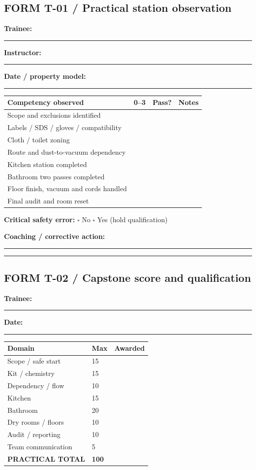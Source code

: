 \documentclass[10pt,letterpaper,oneside]{article}
\newcommand{\smalltable}{\par\small\renewcommand{\arraystretch}{1.24}}
\newcommand{\restorenormalfonttable}{\par\normalsize\renewcommand{\arraystretch}{1}}
\begin{document}
\subsection*{FORM T-01 / Practical station observation}
\textbf{Trainee:} \rule{2.2in}{.3pt} \quad \textbf{Instructor:} \rule{2in}{.3pt}\par
\textbf{Date / property model:} \rule{4.6in}{.3pt}
\smalltable\begin{tabularx}{\linewidth}{X p{.12\linewidth}p{.12\linewidth}p{.12\linewidth}}\toprule
Competency observed & 0--3 & Pass? & Notes\\\midrule
Scope and exclusions identified & & & \\
Labels / SDS / gloves / compatibility & & & \\
Cloth / toilet zoning & & & \\
Route and dust-to-vacuum dependency & & & \\
Kitchen station completed & & & \\
Bathroom two passes completed & & & \\
Floor finish, vacuum and cords handled & & & \\
Final audit and room reset & & & \\
\bottomrule\end{tabularx}\restorenormalfonttable
\textbf{Critical safety error:} \(\square\) No \(\square\) Yes (hold qualification)\par\vspace{12pt}
\textbf{Coaching / corrective action:}\par\rule{\linewidth}{.3pt}\par\vspace{14pt}\rule{\linewidth}{.3pt}
\newpage\subsection*{FORM T-02 / Capstone score and qualification}
\textbf{Trainee:} \rule{2.3in}{.3pt} \quad \textbf{Date:} \rule{1.5in}{.3pt}
\smalltable\begin{tabularx}{\linewidth}{X p{.18\linewidth}p{.16\linewidth}}\toprule
Domain & Max & Awarded\\\midrule
Scope / safe start & 15 & \\
Kit / chemistry & 15 & \\
Dependency / flow & 10 & \\
Kitchen & 15 & \\
Bathroom & 20 & \\
Dry rooms / floors & 10 & \\
Audit / reporting & 10 & \\
Team communication & 5 & \\\midrule
\textbf{PRACTICAL TOTAL} & \textbf{100} & \\\bottomrule\end{tabularx}\restorenormalfonttable
\end{document}
